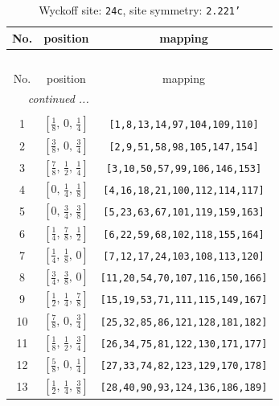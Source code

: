 \documentclass[fleqn,8pt]{jsarticle}
\begin{document}
\begin{longtable}{ccc}
\caption{Wyckoff site: {\tt 24c}, site symmetry: {\tt 2.221'}}
 \\
 \hline \hline
No. & position & mapping \\ \hline \endfirsthead

\multicolumn{2}{l}{\tablename\ \thetable{}} \\
 \hline \hline
No. & position & mapping \\ \hline \endhead

 \hline \hline
\multicolumn{2}{r}{\footnotesize\it continued ...} \\ \endfoot

 \hline \hline
\multicolumn{2}{r}{} \\ \endlastfoot

1 & $\left[ \frac{1}{8},\, 0,\, \frac{1}{4} \right]$ & {\tt [1,8,13,14,97,104,109,110]} \\ \hline
2 & $\left[ \frac{3}{8},\, 0,\, \frac{3}{4} \right]$ & {\tt [2,9,51,58,98,105,147,154]} \\ \hline
3 & $\left[ \frac{7}{8},\, \frac{1}{2},\, \frac{1}{4} \right]$ & {\tt [3,10,50,57,99,106,146,153]} \\ \hline
4 & $\left[ 0,\, \frac{1}{4},\, \frac{1}{8} \right]$ & {\tt [4,16,18,21,100,112,114,117]} \\ \hline
5 & $\left[ 0,\, \frac{3}{4},\, \frac{3}{8} \right]$ & {\tt [5,23,63,67,101,119,159,163]} \\ \hline
6 & $\left[ \frac{1}{4},\, \frac{7}{8},\, \frac{1}{2} \right]$ & {\tt [6,22,59,68,102,118,155,164]} \\ \hline
7 & $\left[ \frac{1}{4},\, \frac{1}{8},\, 0 \right]$ & {\tt [7,12,17,24,103,108,113,120]} \\ \hline
8 & $\left[ \frac{3}{4},\, \frac{3}{8},\, 0 \right]$ & {\tt [11,20,54,70,107,116,150,166]} \\ \hline
9 & $\left[ \frac{1}{2},\, \frac{1}{4},\, \frac{7}{8} \right]$ & {\tt [15,19,53,71,111,115,149,167]} \\ \hline
10 & $\left[ \frac{7}{8},\, 0,\, \frac{3}{4} \right]$ & {\tt [25,32,85,86,121,128,181,182]} \\ \hline
11 & $\left[ \frac{1}{8},\, \frac{1}{2},\, \frac{3}{4} \right]$ & {\tt [26,34,75,81,122,130,171,177]} \\ \hline
12 & $\left[ \frac{5}{8},\, 0,\, \frac{1}{4} \right]$ & {\tt [27,33,74,82,123,129,170,178]} \\ \hline
13 & $\left[ \frac{1}{2},\, \frac{1}{4},\, \frac{3}{8} \right]$ & {\tt [28,40,90,93,124,136,186,189]} \\ \hline

\end{longtable}
\end{document}
